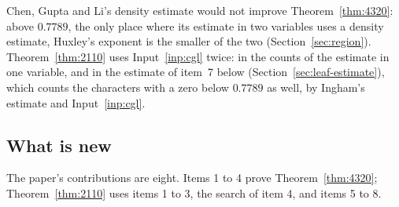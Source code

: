 \documentclass[11pt]{article}
\theoremstyle{definition}
\begin{document}
Chen, Gupta and Li's density estimate would not improve Theorem~\ref{thm:4320}: above $0.7789$, the only place where
its estimate in two variables uses a density estimate, Huxley's exponent is the smaller of the two
(Section~\ref{sec:region}).
Theorem~\ref{thm:2110} uses Input~\ref{inp:cgl} twice: in the counts of the estimate in one variable, and in the
estimate of item~7 below (Section~\ref{sec:leaf-estimate}), which counts the characters with a zero below $0.7789$ as
well, by Ingham's estimate and Input~\ref{inp:cgl}.

\subsection*{What is new}

The paper's contributions are eight. Items 1 to 4 prove Theorem~\ref{thm:4320}; Theorem~\ref{thm:2110} uses items 1
to 3, the search of item 4, and items 5 to 8.
\end{document}

